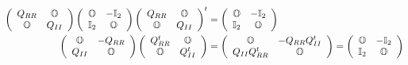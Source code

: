 \documentclass[aps,preprint]{revtex4}%
\begin{document}
\begin{align}
\left(
\begin{array}
[c]{cc}%
Q_{RR} & \mathbb{O}\\
\mathbb{O} & Q_{II}%
\end{array}
\right)  \left(
\begin{array}
[c]{cc}%
\mathbb{O} & \mathbb{-I}_{2}\\
\mathbb{I}_{2} & \mathbb{O}%
\end{array}
\right)  \left(
\begin{array}
[c]{cc}%
Q_{RR} & \mathbb{O}\\
\mathbb{O} & Q_{II}%
\end{array}
\right)  ^{t}  &  =\left(
\begin{array}
[c]{cc}%
\mathbb{O} & \mathbb{-I}_{2}\\
\mathbb{I}_{2} & \mathbb{O}%
\end{array}
\right) \\
\left(
\begin{array}
[c]{cc}%
\mathbb{O} & \mathbb{-}Q_{RR}\\
Q_{II} & \mathbb{O}%
\end{array}
\right)  \left(
\begin{array}
[c]{cc}%
Q_{RR}^{t} & \mathbb{O}\\
\mathbb{O} & Q_{II}^{t}%
\end{array}
\right)   &  =\left(
\begin{array}
[c]{cc}%
\mathbb{O} & \mathbb{-}Q_{RR}Q_{II}^{t}\\
Q_{II}Q_{RR}^{t} & \mathbb{O}%
\end{array}
\right)  =\left(
\begin{array}
[c]{cc}%
\mathbb{O} & \mathbb{-I}_{2}\\
\mathbb{I}_{2} & \mathbb{O}%
\end{array}
\right)
\end{align}
\end{document}
